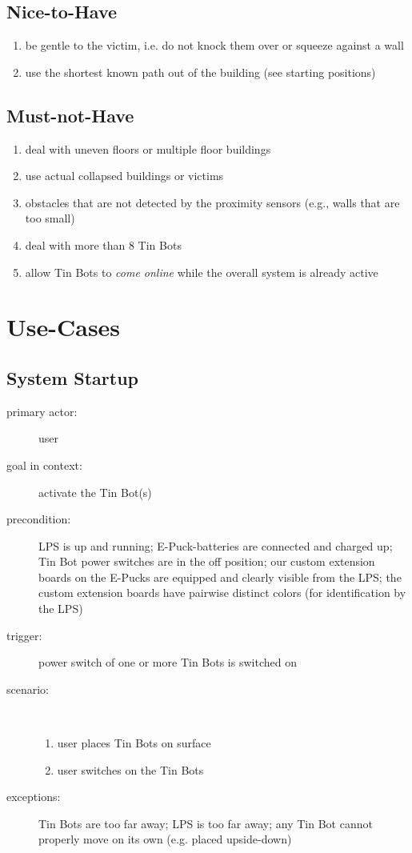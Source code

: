 \documentclass[a4paper,parskip,headheight=38pt]{scrartcl} %
\begin{document}
\subsection{Nice-to-Have}
\begin{enumerate}[label=\nicetohave]
\item be gentle to the victim, i.e. do not knock them over or squeeze against a wall
\item use the shortest known path out of the building (see starting positions)
\end{enumerate}

\subsection{Must-not-Have}
\begin{enumerate}[label=\mustnothave]
\item deal with uneven floors or multiple floor buildings
\item use actual collapsed buildings or victims
\item obstacles that are not detected by the proximity sensors (e.g., walls that are too small)
\item deal with more than 8 Tin Bots
\item allow Tin Bots to \emph{come online} while the overall system is already active
\end{enumerate}


\section{Use-Cases}
\subsection{System Startup}
\begin{description}
\item[primary actor:] user
\item[goal in context:] activate the Tin Bot(s)
\item[precondition:] LPS is up and running; E-Puck-batteries are connected and charged up;
  Tin Bot power switches are in the off position; our custom extension boards on the
  E-Pucks %
  are equipped and clearly visible from the LPS; the custom extension boards have
  pairwise distinct colors (for identification by the LPS)
\item[trigger:] power switch of one or more Tin Bots is switched on
\item[scenario:] \
\begin{enumerate}
	\item user places Tin Bots on surface
	\item user switches on the Tin Bots
\end{enumerate}
\item[exceptions:] Tin Bots are too far away; LPS is too far away; any Tin Bot cannot properly move on its own (e.g. placed upside-down)
\end{description}
\end{document}
